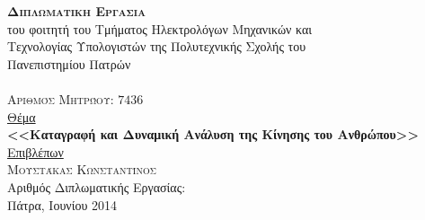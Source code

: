 \hfill
{}
\noindent\makebox[\textwidth]{\rule{\textwidth}{0.4pt}}

\vspace{1.5cm}

\begin{center}
    {\Huge\textsc{\textbf{Διπλωματικη Εργασια}}}\\
    {\Large του φοιτητή του Τμήματος Ηλεκτρολόγων Μηχανικών και\\
    Τεχνολογίας Υπολογιστών της Πολυτεχνικής Σχολής του\\
    Πανεπιστημίου Πατρών}\\[2cm]
    {\Large\textsc{}}\\[10pt]
    {\Large\textsc{Αριθμός Μητρώου: $7436$}}\\[1.5cm]
    {\Large \uline{Θέμα}}\\[10pt]
    {\Large\textbf{<<Καταγραφή και Δυναμική Ανάλυση της Κίνησης του Ανθρώπου>>}}\\[2cm]
    {\Large \uline{Επιβλέπων}}\\[10pt]
    {\Large\textsc{Μουστάκας Κωνσταντίνος}}\\[2cm]
    {\Large Αριθμός Διπλωματικής Εργασίας:}\\
    \vfill
    {\Large{Πάτρα, Ιουνίου 2014}}
\end{center}

